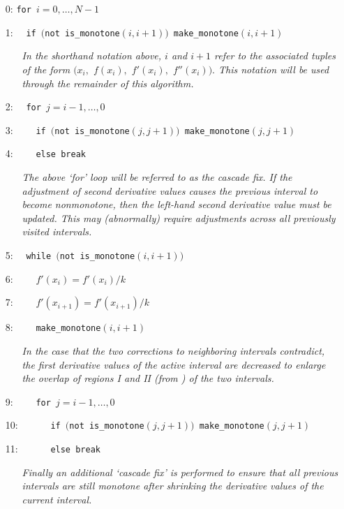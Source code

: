 \documentclass{scspaperproc}
\theoremstyle{scsthe}
\begin{document}
\begin{itemize}
  \itemsep0pt
  \parskip0pt

\item[0:] \texttt{for }$i=0,\ldots,N-1$
\item[1:] $\quad$\texttt{if $\big($not is\_monotone$(i,i+1)\big)$  make\_monotone$(i,i+1)$}

  \begin{itemize}
    \item[] \textit{In the shorthand notation above, $i$ and $i+1$ refer to the associated tuples of the form $(x_i,$ $f(x_i),$ $f'(x_i),$ $f''(x_i)).$ This notation will be used through the remainder of this algorithm.}
  \end{itemize}

\item[2:] $\quad$\texttt{for $j=i-1,\ldots,0$}
\item[3:] $\quad\quad$\texttt{if $\big($not is\_monotone$(j,j+1)\big)$  make\_monotone$(j,j+1)$}
\item[4:] $\quad\quad$\texttt{else break}

  \begin{itemize}
    \item[] \textit{The above `for' loop will be referred to as the cascade fix. If the adjustment of second derivative values causes the previous interval to become nonmonotone, then the left-hand second derivative value must be updated. This may (abnormally) require adjustments across all previously visited intervals.}
  \end{itemize}

\item[5:] $\quad$\texttt{while $\big($not is\_monotone$(i,i+1)\big)$}
\item[6:] $\quad\quad f'(x_i) = f'(x_i) / k$
\item[7:] $\quad\quad f'(x_{i+1}) = f'(x_{i+1}) / k$
\item[8:] $\quad\quad$\texttt{make\_monotone$(i,i+1)$}

  \begin{itemize}
    \item[] \textit{In the case that the two corrections to neighboring intervals contradict, the first derivative values of the active interval are decreased to enlarge the overlap of regions I and II (from \cite{ulrich1994positivity}) of the two intervals.}
  \end{itemize}

\item[9:] $\quad\quad$\texttt{for $j=i-1,\ldots,0$}
\item[10:] $\quad\quad\quad$\texttt{if $\big($not is\_monotone$(j,j+1)\big)$  make\_monotone$(j,j+1)$}
\item[11:] $\quad\quad\quad$\texttt{else break}

  \begin{itemize}
    \item[] \textit{Finally an additional `cascade fix' is performed to ensure that all previous intervals are still monotone after shrinking the derivative values of the current interval.}
  \end{itemize}

\end{itemize}
\end{document}
